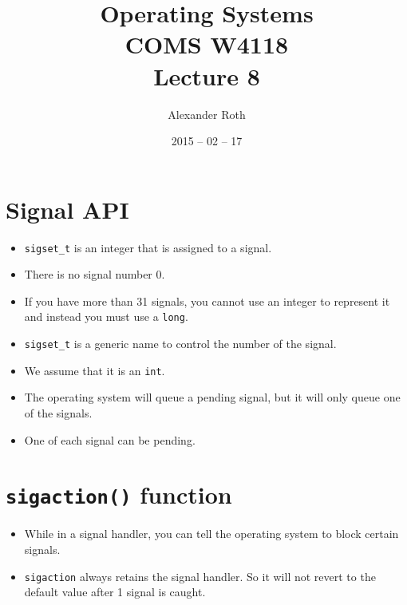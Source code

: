 \documentclass[]{article}
\begin{document}
\newcommand{\code}{\texttt}
\newtheorem{thm}{Theorem}
\title{Operating Systems \\ COMS W4118 \\ Lecture 8}
\author{Alexander Roth}
\date{2015 -- 02 -- 17}
\maketitle

\section{Signal API}
\begin{itemize}
\item \code{sigset\_t} is an integer that is assigned to a signal.
\item There is no signal number 0.
\item If you have more than 31 signals, you cannot use an integer to represent
it and instead you must use a \code{long}.
\item \code{sigset\_t} is a generic name to control the number of the signal.
\item We assume that it is an \code{int}.
\item The operating system will queue a pending signal, but it will only queue
one of the signals.
\item One of each signal can be pending.
\end{itemize}

\section{\code{sigaction()} function}
\begin{itemize}
\item While in a signal handler, you can tell the operating system to block
certain signals.
\item \code{sigaction} always retains the signal handler. So it will not revert
to the default value after 1 signal is caught.
\end{itemize}
\end{document}
